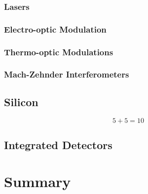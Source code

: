 \subsubsection*{Lasers}

\subsubsection*{Electro-optic Modulation}

\subsubsection*{Thermo-optic Modulations}

\subsubsection*{Mach-Zehnder Interferometers}

\subsection{Silicon}

\begin{equation}
	5+5=10
\end{equation}
	

\subsection{Integrated Detectors}

\section{Summary}


